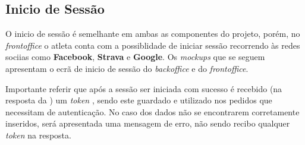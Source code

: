 \subsection{Inicio de Sessão}
\label{loginSequenceDiagram}


O inicio de sessão é semelhante em ambas as componentes do projeto, porém, no \textit{frontoffice} o atleta conta com a possiblidade de iniciar sessão recorrendo às redes sociias como \textbf{Facebook}, \textbf{Strava} e \textbf{Google}. Os \textit{mockups} que se seguem apresentam o ecrã de inicio de sessão do \textit{backoffice} e do \textit{frontoffice}.




Importante referir que após a sessão ser iniciada com sucesso é recebido (na resposta da ) um \textit{token} \textbf{}, sendo este guardado e utilizado nos pedidos que necessitam de autenticação. No caso dos dados não se encontrarem corretamente inseridos, será apresentada uma mensagem de erro, não sendo recibo qualquer \textit{token} na resposta.
